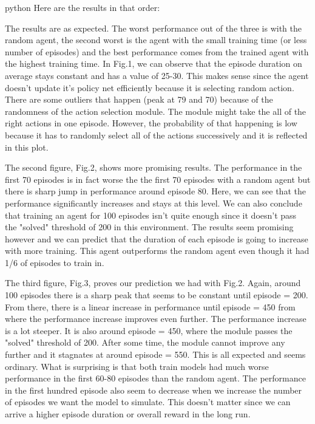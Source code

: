 \documentclass{article}
\numberwithin{equation}{section}
\numberwithin{equation}{section}
\begin{document}
\begin{enumarte}
\begin{mintedbox}{python}
Here are the results in that order:


The results are as expected. The worst performance out of the three is with the random agent, the second worst is the agent with the small training time (or less number of episodes) and the best performance comes from the trained agent with the highest training time. In Fig.1, we can observe that the episode duration on average stays constant and has a value of 25-30. This makes sense since the agent doesn't update it's policy net efficiently because it is selecting random action. There are some outliers that happen (peak at 79 and 70) because of the randomness of the action selection module. The module might take the all of the right actions in one episode. However, the probability of that happening is low because it has to randomly select all of the actions successively and it is reflected in this plot. 

The second figure, Fig.2, shows more promising results. The performance in the first 70 episodes is in fact worse the the first 70 episodes with a random agent but there is sharp jump in performance around episode 80. Here, we can see that the performance significantly increases and stays at this level. We can also conclude that training an agent for 100 episodes isn't quite enough since it doesn't pass the "solved" threshold of 200 in this environment. The results seem promising however and we can predict that the duration of each episode is going to increase with more training. This agent outperforms the random agent even though it had 1/6 of episodes to train in.

The third figure, Fig.3, proves our prediction we had with Fig.2. Again, around 100 episodes there is a sharp peak that seems to be constant until episode = 200. From there, there is a linear increase in performance until episode = 450 from where the performance increase improves even further. The performance increase is a lot steeper. It is also around episode = 450, where the module passes the "solved" threshold of 200. After some time, the module cannot improve any further and it stagnates at around episode = 550. This is all expected and seems ordinary. What is surprising is that both train models had much worse performance in the first 60-80 episodes than the random agent. The performance in the first hundred episode also seem to decrease when we increase the number of episodes we want the model to simulate. This doesn't matter since we can arrive a higher episode duration or overall reward in the long run.



\end{mintedbox}
\end{enumarte}
\end{document}
